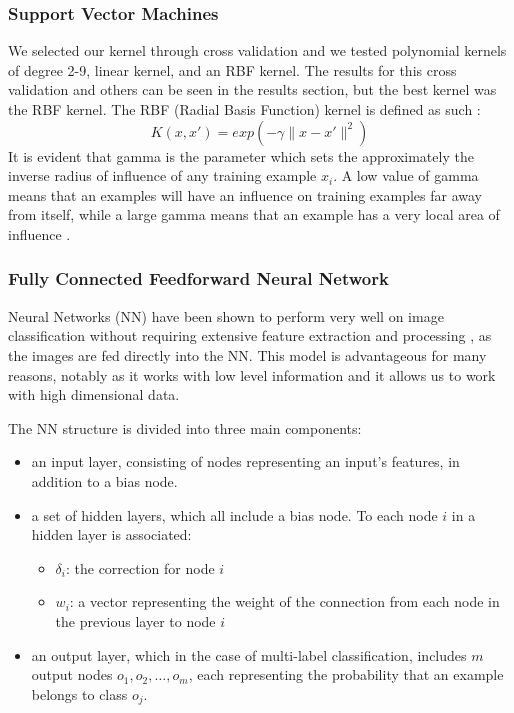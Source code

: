 \documentclass[conference]{IEEEtran}
\begin{document}
\subsubsection{Support Vector Machines}
We selected our kernel through cross validation and we tested polynomial kernels of degree 2-9, linear kernel, and an RBF kernel. The results for this cross validation and others can be seen in the results section, but the best kernel was the RBF kernel. The RBF (Radial Basis Function) kernel is defined as such \cite{Hastie}: \[K(x,x\prime )=exp(-\gamma\|x-x\prime \|^2)\] It is evident that gamma is the parameter which sets the approximately the inverse radius of influence of any training example $x_i$. A low value of gamma means that an examples will have an influence on training examples far away from itself, while a large gamma means that an example has a very local area of influence \cite{sklearn}.


\subsubsection{Fully Connected Feedforward Neural Network}

Neural Networks (NN) have been shown to perform very well on image classification without requiring extensive feature extraction and processing \cite{LeCun90}, as the images are fed directly into the NN. This model is advantageous for many reasons, notably as it works with low level information and it allows us to work with high dimensional data.

The NN structure is divided into three main components: 
\begin{itemize}
\item an input layer, consisting of nodes representing an input's features, in addition to a bias node.
\item a set of hidden layers, which all include a bias node. To each node $i$ in a hidden layer is associated:
\begin{itemize}
\item $\delta_i$: the correction for node $i$
\item $w_i$: a vector representing the weight of the connection from each node in the previous layer to node $i$
\end{itemize}
\item an output layer, which in the case of multi-label classification, includes $m$ output nodes $o_1,o_2,\dots,o_m$, each representing the probability that an example belongs to class $o_j$.
\end{itemize}
\end{document}
